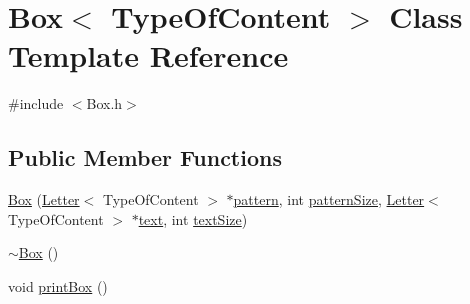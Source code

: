 \hypertarget{classBox}{\section{Box$<$ Type\+Of\+Content $>$ Class Template Reference}
\label{classBox}
}


{\ttfamily \#include $<$Box.\+h$>$}

\subsection*{Public Member Functions}
\begin{DoxyCompactItemize}
\item 
\hyperlink{classBox_a0946e5527494183bd61672e12bca5cbc}{Box} (\hyperlink{classLetter}{Letter}$<$ Type\+Of\+Content $>$ $\ast$\hyperlink{classBox_aa1b857944564f517d12997289e5987ba}{pattern}, int \hyperlink{classBox_acadd4d6b43a90560a093cb64aa77b7e9}{pattern\+Size}, \hyperlink{classLetter}{Letter}$<$ Type\+Of\+Content $>$ $\ast$\hyperlink{classBox_a5c23fcbcde78ac65c62127c2b272ac30}{text}, int \hyperlink{classBox_a2bfb2b656e74bc0f87f8acda76afbc86}{text\+Size})
\item 
\hyperlink{classBox_a5eeacaebc9bab0e00cd0b0d80635c6ec}{$\sim$\+Box} ()
\item 
void \hyperlink{classBox_a0c6759886250c36ed1b6a2d6915585e3}{print\+Box} ()
\end{DoxyCompactItemize}
